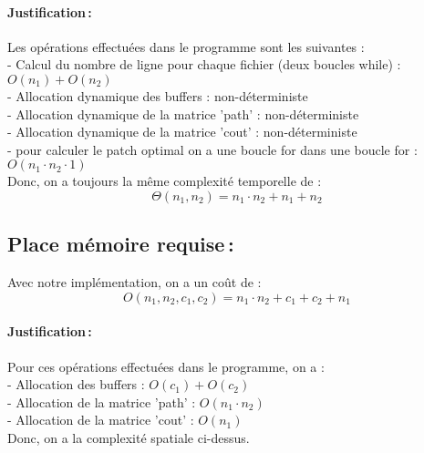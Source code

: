 \documentclass[a4paper, 10pt, french]{article}
\begin{document}
    \paragraph{Justification\,: }
    Les opérations effectuées dans le programme sont les suivantes :\\
    \indent - Calcul du nombre de ligne pour chaque fichier (deux boucles while) : $O(n_1) + O(n_2)$\\
    \indent - Allocation dynamique des buffers : non-déterministe\\
    \indent - Allocation dynamique de la matrice 'path' : non-déterministe\\
    \indent - Allocation dynamique de la matrice 'cout' : non-déterministe\\
    \indent - pour calculer le patch optimal on a une boucle for dans une boucle for : $O(n_1\cdot n_2\cdot1)$\\
    Donc, on a toujours la même complexité temporelle de :
\[
\Theta(n_1,n_2) = n_1 \cdot n_2 + n_1 + n_2
\]

  \subsection{Place mémoire requise\,: }
Avec notre implémentation, on a un coût de :\\
\[
O(n_1,n_2,c_1,c_2) = n_1 \cdot n_2 + c_1 + c_2 + n_1
\]  
  \paragraph{Justification\,: }
    Pour ces opérations effectuées dans le programme, on a :\\
    \indent - Allocation des buffers : $O(c_1) + O(c_2)$\\
    \indent - Allocation de la matrice 'path' : $O(n_1 \cdot n_2)$\\
    \indent - Allocation de la matrice 'cout' : $O(n_1)$\\
    Donc, on a la complexité spatiale ci-dessus.
\end{document}
